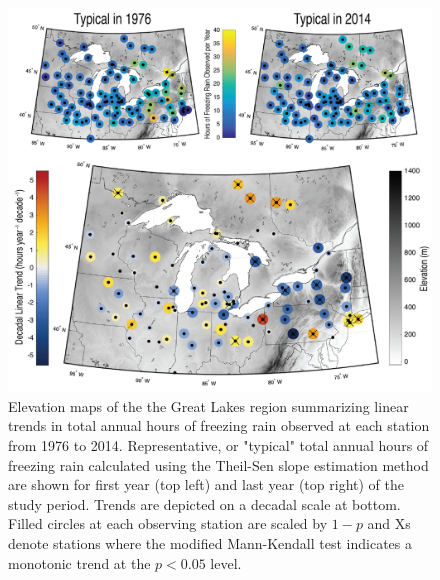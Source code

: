 \documentclass[twocol]{ametsoc}
\begin{document}
\begin{figure}
\centering
\includegraphics[width=1.0\textwidth]{FZRA_trend_maps.png}
\caption{\label{fig:trendmap}Elevation maps of the the Great Lakes region summarizing linear trends in total annual hours of freezing rain observed at each station from 1976 to 2014. Representative, or "typical" total annual hours of freezing rain calculated using the Theil-Sen slope estimation method are shown for first year (top left) and last year (top right) of the study period. Trends are depicted on a decadal scale at bottom. Filled circles at each observing station are scaled by $1 - p$ and Xs denote stations where the modified Mann-Kendall test indicates a monotonic trend at the $p<0.05$ level.}
\end{figure}
\end{document}
